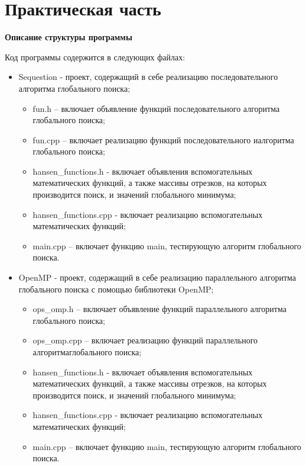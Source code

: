 \documentclass{report}
\begin{document}
\newpage

\chapter{Практическая часть}

\textbf{Описание структуры программы}

Код программы содержится в следующих файлах:
\begin{itemize}
    \item Sequestion -  проект, содержащий в себе реализацию последовательного алгоритма глобального поиска;
        \begin{itemize}
            \item fun.h – включает объявление функций последовательного алгоритма глобального поиска;
            \item fun.cpp – включает реализацию функций последовательного иалгоритма глобального поиска;
            \item hansen\_functions.h - включает объявления вспомогательных математических функций, а также массивы отрезков, на которых производится поиск, и значений глобального минимума;
            \item hansen\_functions.cpp - включает реализацию вспомогательных математических функций;
            \item main.cpp – включает функцию main, тестирующую алгоритм глобального поиска.
        \end{itemize}
    \item OpenMP - проект, содержащий в себе реализацию параллельного алгоритма глобального поиска с помощью библиотеки OpenMP;
        \begin{itemize}
            \item ops\_omp.h – включает объявление функций параллельного алгоритма глобального поиска;
            \item ops\_omp.cpp – включает реализацию функций параллельного алгоритмаглобального поиска;
            \item hansen\_functions.h - включает объявления вспомогательных математических функций, а также массивы отрезков, на которых производится поиск, и значений глобального минимума;
            \item hansen\_functions.cpp - включает реализацию вспомогательных математических функций;
            \item main.cpp – включает функцию main, тестирующую алгоритм глобального поиска.
        \end{itemize}

\end{itemize}
\end{document}

